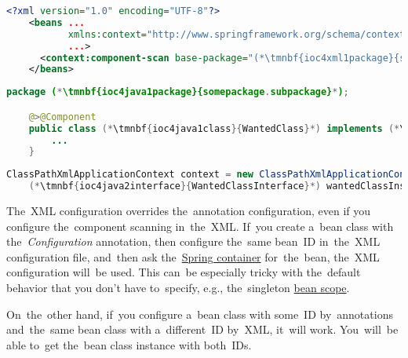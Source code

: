 \begin{lstlisting}[language=XML, title={Configuration XML}]
    <?xml version="1.0" encoding="UTF-8"?>
    <beans ...
           xmlns:context="http://www.springframework.org/schema/context"
           ...>
      <context:component-scan base-package="(*\tmnbf{ioc4xml1package}{somepackage.subpackage}[ForestGreen]*)"/>
    </beans>
\end{lstlisting}
\begin{lstlisting}[language=Java, title={Wanted class}]
    package (*\tmnbf{ioc4java1package}{somepackage.subpackage}*);

    @>@Component
    public class (*\tmnbf{ioc4java1class}{WantedClass}*) implements (*\tmnbf{ioc4java1interface}{WantedClassInterface}*) {
        ...
    }
\end{lstlisting}
\begin{lstlisting}[language=Java, title={Usage}]
    ClassPathXmlApplicationContext context = new ClassPathXmlApplicationContext("configurationFile.xml");
    (*\tmnbf{ioc4java2interface}{WantedClassInterface}*) wantedClassInstance = context.getBean("(*\tmnbf{ioc4java2beanid}{wantedClass}[ForestGreen]*)", (*\tmnbf{ioc4java2interface2}{WantedClassInterface}*).class);
\end{lstlisting}

\warningnonl The~XML configuration overrides the~annotation configuration, even if you configure the~component scanning in~the~XML.
If~you create a~bean class with the~\textit{Configuration} annotation, then configure the~same bean~ID in~the~XML configuration file, and~then ask the~\hyperref[springcontainrer]{Spring container} for~the~bean, the~XML configuration will~be used.
This can~be especially tricky with the~default behavior that you don't have to~specify, e.g., the~singleton \hyperref[beanscope]{bean scope}.

On~the~other hand, if~you configure a~bean class with some~ID by~annotations and~the~same bean class with a~different~ID by~XML, it~will work.
You~will~be able to~get the~bean class instance with both~IDs.

